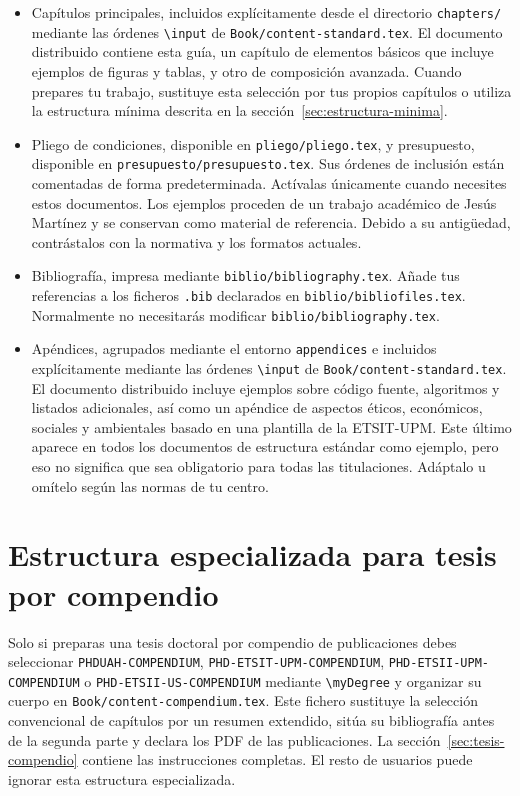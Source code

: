 \begin{itemize}
  \item Capítulos principales, incluidos explícitamente desde el directorio \texttt{chapters/} mediante las órdenes \texttt{\textbackslash{}input} de \texttt{Book/content-standard.tex}. El documento distribuido contiene esta guía, un capítulo de elementos básicos que incluye ejemplos de figuras y tablas, y otro de composición avanzada. Cuando prepares tu trabajo, sustituye esta selección por tus propios capítulos o utiliza la estructura mínima descrita en la sección~\ref{sec:estructura-minima}.
  \item Pliego de condiciones, disponible en \texttt{pliego/pliego.tex}, y presupuesto, disponible en \texttt{presupuesto/presupuesto.tex}. Sus órdenes de inclusión están comentadas de forma predeterminada. Actívalas únicamente cuando necesites estos documentos. Los ejemplos proceden de un trabajo académico de Jesús Martínez y se conservan como material de referencia. Debido a su antigüedad, contrástalos con la normativa y los formatos actuales.
  \item Bibliografía, impresa mediante \texttt{biblio/bibliography.tex}. Añade tus referencias a los ficheros \texttt{.bib} declarados en \texttt{biblio/bibliofiles.tex}. Normalmente no necesitarás modificar \texttt{biblio/bibliography.tex}.
  \item Apéndices, agrupados mediante el entorno \texttt{appendices} e incluidos explícitamente mediante las órdenes \texttt{\textbackslash{}input} de \texttt{Book/content-standard.tex}. El documento distribuido incluye ejemplos sobre código fuente, algoritmos y listados adicionales, así como un apéndice de aspectos éticos, económicos, sociales y ambientales basado en una plantilla de la ETSIT-UPM. Este último aparece en todos los documentos de estructura estándar como ejemplo, pero eso no significa que sea obligatorio para todas las titulaciones. Adáptalo u omítelo según las normas de tu centro.
\end{itemize}

\section{Estructura especializada para tesis por compendio}

Solo si preparas una tesis doctoral por compendio de publicaciones debes seleccionar \texttt{PHDUAH-COMPENDIUM}, \texttt{PHD-ETSIT-UPM-COMPENDIUM}, \texttt{PHD-ETSII-UPM-COMPENDIUM} o \texttt{PHD-ETSII-US-COMPENDIUM} mediante \texttt{\textbackslash{}myDegree} y organizar su cuerpo en \texttt{Book/content-compendium.tex}. Este fichero sustituye la selección convencional de capítulos por un resumen extendido, sitúa su bibliografía antes de la segunda parte y declara los PDF de las publicaciones. La sección~\ref{sec:tesis-compendio} contiene las instrucciones completas. El resto de usuarios puede ignorar esta estructura especializada.

